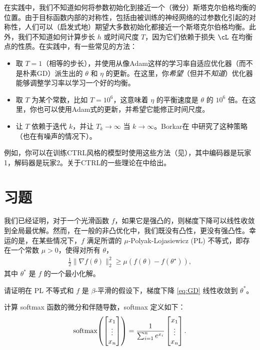 \documentclass[../../book-main.tex]{subfiles}
\begin{document}
在实践中，我们不知道如何将参数初始化到接近一个（微分）斯塔克尔伯格均衡的位置。由于目标函数内部的对称性，包括由被训练的神经网络的过参数化引起的对称性，人们可以（启发式地）期望大多数初始化都接近一个斯塔克尔伯格均衡。此外，我们不知道如何计算步长 \(h\) 或时间尺度 \(T\)，因为它们依赖于损失 \(\cL\) 在均衡点的性质。在实践中，有一些常见的方法：
\begin{itemize}
    \item 取 \(T = 1\)（相等的步长），并使用从像Adam这样的学习率自适应优化器（而不是朴素GD）派生出的 \(\theta\) 和 \(\eta\) 的更新。在这里，你\textit{希望}（但并不\textit{知道}）优化器能够调整学习率以学习一个好的均衡。
    \item 取 \(T\) 为某个常数，比如 \(T = 10^{6}\)，这意味着 \(\eta\) 的平衡速度是 \(\theta\) 的 \(10^{6}\) 倍。在这里，你也可以使用Adam式的更新，并希望它能修正时间尺度。
    \item 让 \(T\) 依赖于迭代 \(k\)，并让 \(T_{k} \to \infty\) 当 \(k \to \infty\)。Borkar在 \cite{borkar1997stochastic} 中研究了这种策略（也在有噪声的情况下）。
\end{itemize}
例如，你可以在训练CTRL风格的模型时使用这些方法（见），其中编码器是玩家1，解码器是玩家2。关于CTRL的一些理论在中给出。


\section{习题}

\begin{exercise}
    我们已经证明，对于一个光滑函数 $f$，如果它是强凸的，则梯度下降可以线性收敛到全局最优解。然而，在一般的非凸优化中，我们既没有凸性，更没有强凸性。幸运的是，在某些情况下，$f$ 满足所谓的 $\mu$-Polyak-Lojasiewicz (PL) 不等式，即存在一个常数 $\mu > 0$，使得对所有 $\theta$，
    \begin{align*}
        \frac{1}{2}\|\nabla f(\theta)\|_2^2 \ge \mu\left( f(\theta) - f(\theta^\star) \right),
    \end{align*}
    其中 $\theta^*$ 是 $f$ 的一个最小化解。  
    
    请证明在 PL 不等式和 $f$ 是 $\beta$-平滑的假设下，梯度下降 \eqref{eq:GD} 线性收敛到 $\theta^*$。 
\end{exercise}

\begin{exercise}
    计算 softmax 函数的微分和伴随导数，softmax 定义如下：
    \begin{equation}
        \softmax\rp{\mat{x_{1} \\ \vdots \\ x_{n}}} = \frac{1}{\sum_{i = 1}^{n}e^{x_{i}}}\mat{x_{1} \\ \vdots \\ x_{n}}.
    \end{equation}
\end{exercise}
\end{document}

